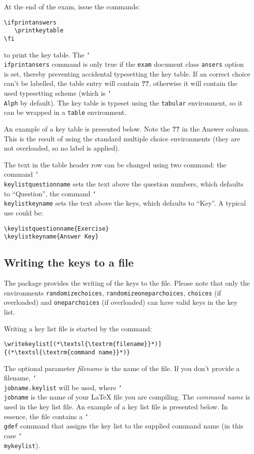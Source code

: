 \documentclass[12pt,a4paper]{exam}
\providecommand{\texorpdfstring}[2]{#1}
\newcommand{\bs}{\texorpdfstring{\char`\\}{}}
\begin{document}
At the end of the exam, issue the commands:

\begin{lstlisting}
\ifprintanswers
   \printkeytable
\fi
\end{lstlisting}

to print the key table. The \texttt{\bs ifprintansers} command is only true if the
\texttt{exam} document class \texttt{ansers} option is set, thereby preventing
accidental typesetting the key table. If an correct choice can't be labelled, the
table entry will contain \textbf{??}, otherwise it will contain the used typesetting scheme
(which is \texttt{\bs Alph} by default).
The key table is typeset using the \texttt{tabular}
environment, so it can be wrapped in a \texttt{table} environment.

An example of a key table is presented below. Note the \textbf{??} in the
Answer column. This is the result of using the standard multiple choice
environments (they are not overloaded, so no label is applied).

\printkeytable

The text in the table header row can be changed using two command: the command
\texttt{\bs keylistquestionname} sets the text above the question numbers, which
defaults to ``Question'', the command \texttt{\bs keylistkeyname} sets the text
above the keys, which defaults to ``Key''. A typical use could be:

\begin{lstlisting}
\keylistquestionname{Exercise}
\keylistkeyname{Answer Key}
\end{lstlisting}

\subsection{Writing the keys to a file}
The package provides the writing of the keys to the file.
Please note that only the environments \texttt{randomizechoices},
\texttt{randomizeoneparchoices}, \texttt{choices} (if overloaded) and
\texttt{oneparchoices} (if overloaded) can have valid keys in the key list.

Writing a key list file is started by the command:

\begin{lstlisting}
\writekeylist[(*\textsl{\textrm{filename}}*)]{(*\textsl{\textrm{command name}}*)}
\end{lstlisting}

The optional parameter \emph{filename} is the name of the file. If you don't
provide a filename, \texttt{\bs jobname.keylist} will be used,
where \texttt{\bs jobname} is the name of your \LaTeX{} file you are compiling.
The \emph{command name} is used in the key list file. An example of a key list file
is presented below. In essence, the file contains a \texttt{\bs gdef} command
that assigns the key list to the supplied command name (in this case
\texttt{\bs mykeylist}).
\end{document}
